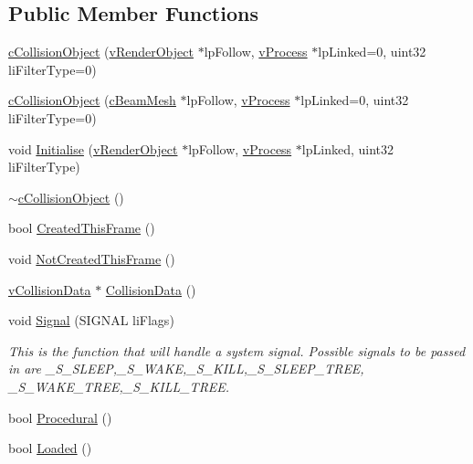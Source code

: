 \subsection*{Public Member Functions}
\begin{DoxyCompactItemize}
\item 
\hyperlink{classc_collision_object_a90f4a7fe0445396ddf49e14bda27f2dc}{cCollisionObject} (\hyperlink{classv_render_object}{vRenderObject} $\ast$lpFollow, \hyperlink{classv_process}{vProcess} $\ast$lpLinked=0, uint32 liFilterType=0)
\item 
\hyperlink{classc_collision_object_a38fc1abcd7a0f240d7ce41aca108bb43}{cCollisionObject} (\hyperlink{classc_beam_mesh}{cBeamMesh} $\ast$lpFollow, \hyperlink{classv_process}{vProcess} $\ast$lpLinked=0, uint32 liFilterType=0)
\item 
void \hyperlink{classc_collision_object_a4aaae58a85bd7c1e6b5601a4e4cac3c1}{Initialise} (\hyperlink{classv_render_object}{vRenderObject} $\ast$lpFollow, \hyperlink{classv_process}{vProcess} $\ast$lpLinked, uint32 liFilterType)
\item 
\hyperlink{classc_collision_object_ac01e53c6dadd3ab8036f485b9115aedd}{$\sim$cCollisionObject} ()
\item 
bool \hyperlink{classc_collision_object_ac56988f3641d39409fbf4ccba3525282}{CreatedThisFrame} ()
\item 
void \hyperlink{classc_collision_object_a31156a5bfff63de45daa32893a30697c}{NotCreatedThisFrame} ()
\item 
\hyperlink{classv_collision_data}{vCollisionData} $\ast$ \hyperlink{classc_collision_object_a58a3680126c2d7e405ec80402cb8208e}{CollisionData} ()
\item 
void \hyperlink{classc_collision_object_abec1a68ab54f2e80244c8b336bca3626}{Signal} (SIGNAL liFlags)
\begin{DoxyCompactList}\small\item\em This is the function that will handle a system signal. Possible signals to be passed in are \_\-S\_\-SLEEP,\_\-S\_\-WAKE,\_\-S\_\-KILL,\_\-S\_\-SLEEP\_\-TREE, \_\-S\_\-WAKE\_\-TREE,\_\-S\_\-KILL\_\-TREE. \item\end{DoxyCompactList}\item 
bool \hyperlink{classc_collision_object_a9d4e4fe61df1af3479247611d605e897}{Procedural} ()
\item 
bool \hyperlink{classc_collision_object_a695516ede632cf0e02ddbcd7b6e539a7}{Loaded} ()
\item 

\end{DoxyCompactItemize}
